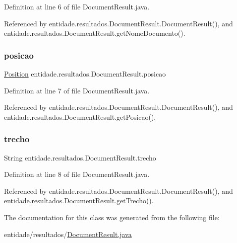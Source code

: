 Definition at line 6 of file Document\+Result.\+java.



Referenced by entidade.\+resultados.\+Document\+Result.\+Document\+Result(), and entidade.\+resultados.\+Document\+Result.\+get\+Nome\+Documento().

\hypertarget{classentidade_1_1resultados_1_1DocumentResult_af0690de1fbdf3817b5a534754656f156}{}\label{classentidade_1_1resultados_1_1DocumentResult_af0690de1fbdf3817b5a534754656f156} 
\subsubsection{\texorpdfstring{posicao}{posicao}}
{\footnotesize\ttfamily \hyperlink{classentidade_1_1Position}{Position} entidade.\+resultados.\+Document\+Result.\+posicao\hspace{0.3cm}{\ttfamily [private]}}



Definition at line 7 of file Document\+Result.\+java.



Referenced by entidade.\+resultados.\+Document\+Result.\+Document\+Result(), and entidade.\+resultados.\+Document\+Result.\+get\+Posicao().

\hypertarget{classentidade_1_1resultados_1_1DocumentResult_ad6290fdc6352643297775c26d098003b}{}\label{classentidade_1_1resultados_1_1DocumentResult_ad6290fdc6352643297775c26d098003b} 
\subsubsection{\texorpdfstring{trecho}{trecho}}
{\footnotesize\ttfamily String entidade.\+resultados.\+Document\+Result.\+trecho\hspace{0.3cm}{\ttfamily [private]}}



Definition at line 8 of file Document\+Result.\+java.



Referenced by entidade.\+resultados.\+Document\+Result.\+Document\+Result(), and entidade.\+resultados.\+Document\+Result.\+get\+Trecho().



The documentation for this class was generated from the following file\+:\begin{DoxyCompactItemize}
\item 
entidade/resultados/\hyperlink{DocumentResult_8java}{Document\+Result.\+java}\end{DoxyCompactItemize}
